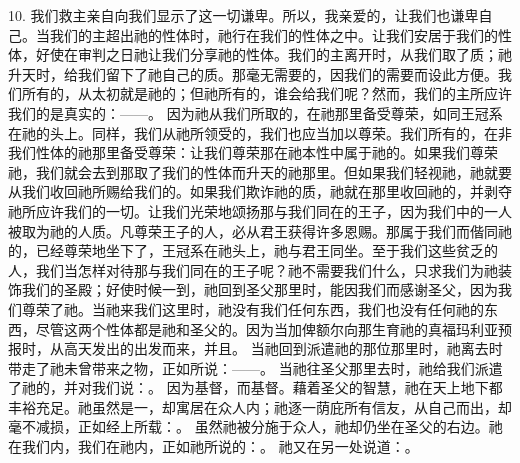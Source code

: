 10. 我们救主亲自向我们显示了这一切谦卑。所以，我亲爱的，让我们也谦卑自己。当我们的主超出祂的性体时，祂行在我们的性体之中。让我们安居于我们的性体，好使在审判之日祂让我们分享祂的性体。我们的主离开时，从我们取了质；祂升天时，给我们留下了祂自己的质。那毫无需要的，因我们的需要而设此方便。我们所有的，从太初就是祂的；但祂所有的，谁会给我们呢？然而，我们的主所应许我们的是真实的：——。 因为祂从我们所取的，在祂那里备受尊荣，如同王冠系在祂的头上。同样，我们从祂所领受的，我们也应当加以尊荣。我们所有的，在非我们性体的祂那里备受尊荣：让我们尊荣那在祂本性中属于祂的。如果我们尊荣祂，我们就会去到那取了我们的性体而升天的祂那里。但如果我们轻视祂，祂就要从我们收回祂所赐给我们的。如果我们欺诈祂的质，祂就在那里收回祂的，并剥夺祂所应许我们的一切。让我们光荣地颂扬那与我们同在的王子，因为我们中的一人被取为祂的人质。凡尊荣王子的人，必从君王获得许多恩赐。那属于我们而偕同祂的，已经尊荣地坐下了，王冠系在祂头上，祂与君王同坐。至于我们这些贫乏的人，我们当怎样对待那与我们同在的王子呢？祂不需要我们什么，只求我们为祂装饰我们的圣殿；好使时候一到，祂回到圣父那里时，能因我们而感谢圣父，因为我们尊荣了祂。当祂来我们这里时，祂没有我们任何东西，我们也没有任何祂的东西，尽管这两个性体都是祂和圣父的。因为当加俾额尔向那生育祂的真福玛利亚预报时，从高天发出的出发而来，并且。 当祂回到派遣祂的那位那里时，祂离去时带走了祂未曾带来之物，正如所说：——。 当祂往圣父那里去时，祂给我们派遣了祂的，并对我们说：。 因为基督，而基督。藉着圣父的智慧，祂在天上地下都丰裕充足。祂虽然是一，却寓居在众人内；祂逐一荫庇所有信友，从自己而出，却毫不减损，正如经上所载：。 虽然祂被分施于众人，祂却仍坐在圣父的右边。祂在我们内，我们在祂内，正如祂所说的：。 祂又在另一处说道：。\par

